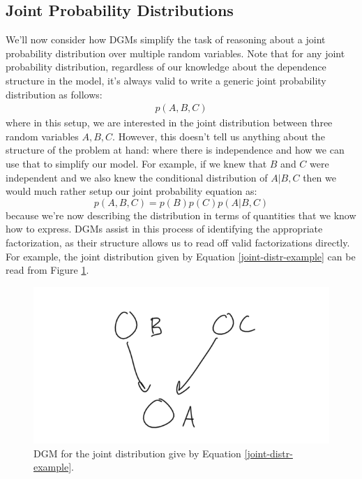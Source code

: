 \subsection{Joint Probability Distributions}
We'll now consider how DGMs simplify the task of reasoning about a joint probability distribution over multiple random variables. Note that for any joint probability distribution, regardless of our knowledge about the dependence structure in the model, it's always valid to write a generic joint probability distribution as follows:
\begin{align*}
	p(A, B, C)
\end{align*}
where in this setup, we are interested in the joint distribution between three random variables $A, B, C$. However, this doesn't tell us anything about the structure of the problem at hand: where there is independence and how we can use that to simplify our model. For example, if we knew that $B$ and $C$ were independent and we also knew the conditional distribution of $A | B, C$ then we would much rather setup our joint probability equation as:
\begin{equation} \label{joint-distr-example}
	p(A, B, C) = p(B)p(C)p(A | B, C)
\end{equation}
because we're now describing the distribution in terms of quantities that we know how to express. DGMs assist in this process of identifying the appropriate factorization, as their structure allows us to read off valid factorizations directly. For example, the joint distribution given by Equation \ref{joint-distr-example} can be read from Figure \ref{fig:joint-distr-example-dgm}.
\begin{figure}
    \centering
    \includegraphics[width=0.5\paperwidth]{../GraphicalModels/fig/joint-distr-example-dgm.png}
    \caption{DGM for the joint distribution give by Equation \ref{joint-distr-example}.}
    \label{fig:joint-distr-example-dgm}
\end{figure}

